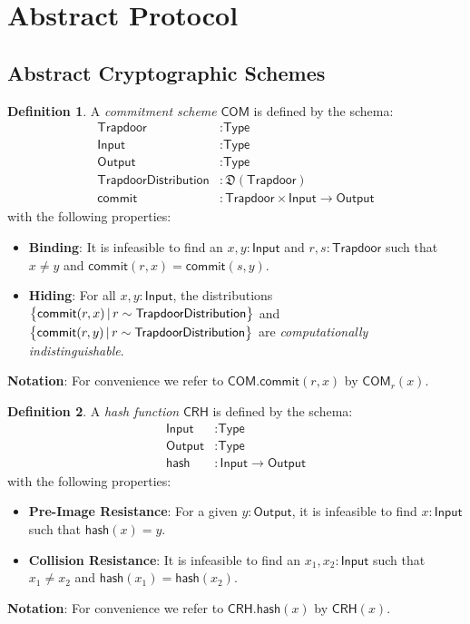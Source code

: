 \documentclass[a4paper]{article}
\newcommand{\lsection}[2]{\def\sectionlabel{#2} \section{#1}\label{sec:#2}}
\theoremstyle{definition}
\newtheorem{definition}{Definition}[subsection]
\newcommand{\COM}{{\textsf{COM}}}
\newcommand{\CRH}{{\textsf{CRH}}}
\newcommand{\Input}{{\textsf{Input}}}
\newcommand{\Output}{{\textsf{Output}}}
\newcommand{\TrapdoorDistribution}{{\textsf{TrapdoorDistribution}}}
\newcommand{\Trapdoor}{{\textsf{Trapdoor}}}
\newcommand{\Type}{{\textsf{Type}}}
\newcommand{\commit}{{\textsf{commit}}}
\newcommand{\hash}{{\textsf{hash}}}
\begin{document}
\lsection{Abstract Protocol}{abstract-protocol}

\subsection{Abstract Cryptographic Schemes}

\begin{definition}
    A \emph{commitment scheme} $\COM$ is defined by the schema:
    \begin{align*}
        \Trapdoor             &: \Type \\
        \Input                &: \Type \\
        \Output               &: \Type \\
        \TrapdoorDistribution &: \mathfrak{D}(\Trapdoor) \\
        \commit               &: \Trapdoor \times \Input \to \Output
    \end{align*}
    with the following properties:

    \begin{itemize}
        \item \textbf{Binding}: It is infeasible to find an $x, y : \Input$ and $r, s: \Trapdoor$ such that $x \ne y$ and $\commit(r,x) = \commit(s,y)$.
        \item \textbf{Hiding}: For all $x, y : \Input$, the distributions $\set{\commit(r,x) \,|\, r \sim \TrapdoorDistribution}$ and \\ $\set{\commit(r,y) \,|\, r \sim \TrapdoorDistribution}$ are \emph{computationally indistinguishable}.
    \end{itemize}

\textbf{Notation}: For convenience we refer to $\COM.\commit(r,x)$ by $\COM_r(x)$.
\end{definition}

\begin{definition}
A \emph{hash function} $\CRH$ is defined by the schema:
\begin{align*}
    \Input  &: \Type \\
    \Output &: \Type \\
    \hash   &: \Input \to \Output
\end{align*}
with the following properties:

\begin{itemize}
    \item \textbf{Pre-Image Resistance}: For a given $y : \Output$, it is infeasible to find $x : \Input$ such that $\hash(x) = y$.
    \item \textbf{Collision Resistance}: It is infeasible to find an $x_1, x_2 : \Input$ such that $x_1 \ne x_2$ and $\hash(x_1) = \hash(x_2)$.
\end{itemize}

\textbf{Notation}: For convenience we refer to $\CRH.\hash(x)$ by $\CRH(x)$.
\end{definition}
\end{document}
